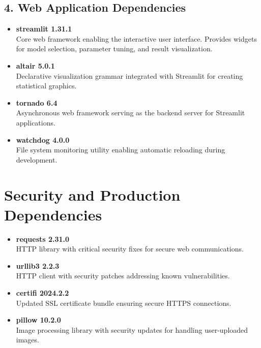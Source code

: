 \subsection*{4. Web Application Dependencies}

\begin{itemize}
	\item \textbf{streamlit 1.31.1} \\
	Core web framework enabling the interactive user interface. Provides widgets for model selection, parameter tuning, and result visualization.
	
	\item \textbf{altair 5.0.1} \\
	Declarative visualization grammar integrated with Streamlit for creating statistical graphics.
	
	\item \textbf{tornado 6.4} \\
	Asynchronous web framework serving as the backend server for Streamlit applications.
	
	\item \textbf{watchdog 4.0.0} \\
	File system monitoring utility enabling automatic reloading during development.
\end{itemize}

\section*{Security and Production Dependencies}

\begin{itemize}
	\item \textbf{requests 2.31.0} \\
	HTTP library with critical security fixes for secure web communications.
	
	\item \textbf{urllib3 2.2.3} \\
	HTTP client with security patches addressing known vulnerabilities.
	
	\item \textbf{certifi 2024.2.2} \\
	Updated SSL certificate bundle ensuring secure HTTPS connections.
	
	\item \textbf{pillow 10.2.0} \\
	Image processing library with security updates for handling user-uploaded images.
\end{itemize}

